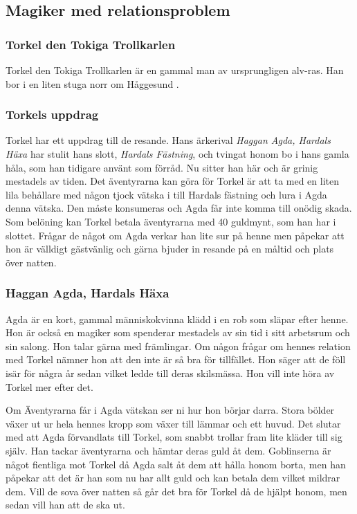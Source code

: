 \subsection{Magiker med relationsproblem}
\label{magikerMedRelationsproblem}
%
\subsubsection{Torkel den Tokiga Trollkarlen}
Torkel den Tokiga Trollkarlen är en gammal man av ursprungligen alv-ras. Han bor i en liten stuga norr om Håggesund \sectiondescribe{\ref{torkelsStuga}}.
%
\subsubsection{Torkels uppdrag}
Torkel har ett uppdrag till de resande. Hans ärkerival \textit{Haggan Agda, Hardals Häxa} har stulit hans slott, \textit{Hardals Fästning}, och tvingat honom bo i hans gamla håla, som han tidigare använt som förråd. Nu sitter han här och är grinig mestadels av tiden. Det äventyrarna kan göra för Torkel är att ta med en liten lila behållare med någon tjock vätska i till Hardals fästning och lura i Agda denna vätska. Den måste konsumeras och Agda får inte komma till onödig skada. Som belöning kan Torkel betala äventyrarna med 40 guldmynt, som han har i slottet. Frågar de något om Agda verkar han lite sur på henne men påpekar att hon är välldigt gästvänlig och gärna bjuder in resande på en måltid och plats över natten.
%
\subsubsection{Haggan Agda, Hardals Häxa}
\label{hagganAgda}
Agda är en kort, gammal människokvinna klädd i en rob som släpar efter henne. Hon är också en magiker som spenderar mestadels av sin tid i sitt arbetsrum och sin salong. Hon talar gärna med främlingar. Om någon frågar om hennes relation med Torkel nämner hon att den inte är så bra för tillfället. Hon säger att de föll isär för några år sedan vilket ledde till deras skilsmässa. Hon vill inte höra av Torkel mer efter det.

Om Äventyrarna får i Agda vätskan ser ni hur hon börjar darra. Stora bölder växer ut ur hela hennes kropp som växer till lämmar och ett huvud. Det slutar med att Agda förvandlats till Torkel, som snabbt trollar fram lite kläder till sig själv. Han tackar äventyrarna och hämtar deras guld åt dem. Goblinserna är något fientliga mot Torkel då Agda salt åt dem att hålla honom borta, men han påpekar att det är han som nu har allt guld och kan betala dem vilket mildrar dem. Vill de sova över natten så går det bra för Torkel då de hjälpt honom, men sedan vill han att de ska ut. 

